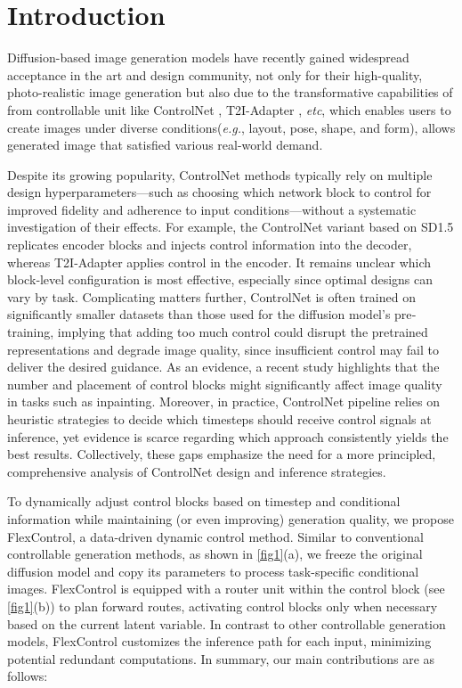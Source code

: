 \section{Introduction}
\label{sec:intro}

Diffusion-based image generation models have recently gained widespread acceptance in the art and design community, not only for their high-quality, photo-realistic image generation but also due to the transformative capabilities of from controllable unit like ControlNet \cite{zhang2023adding}, T2I-Adapter \cite{mou2024t2i}, \textit{etc}, which enables users to create images under diverse conditions(\textit{e.g.}, layout, pose, shape, and form), allows generated image that satisfied various real-world demand.

Despite its growing popularity, ControlNet methods typically rely on multiple design hyperparameters—such as choosing which network block to control for improved fidelity and adherence to input conditions—without a systematic investigation of their effects. For example, the ControlNet variant based on SD1.5 \cite{SD1.5} replicates encoder blocks and injects control information into the decoder, whereas T2I-Adapter applies control in the encoder. It remains unclear which block‐level configuration is most effective, especially since optimal designs can vary by task. Complicating matters further, ControlNet is often trained on significantly smaller datasets than those used for the diffusion model’s pre‐training, implying that adding too much control could disrupt the pretrained representations and degrade image quality, since insufficient control may fail to deliver the desired guidance. As an evidence, a recent study \cite{ju2024brushnet} highlights that the number and placement of control blocks might significantly affect image quality in tasks such as inpainting. Moreover, in practice, ControlNet pipeline relies on heuristic strategies to decide which timesteps should receive control signals at inference, yet evidence is scarce regarding which approach consistently yields the best results. Collectively, these gaps emphasize the need for a more principled, comprehensive analysis of ControlNet design and inference strategies.

To dynamically adjust control blocks based on timestep and conditional information while maintaining (or even improving) generation quality, we propose FlexControl, a data-driven dynamic control method. Similar to conventional controllable generation methods, as shown in \cref{fig1}(a), we freeze the original diffusion model and copy its parameters to process task-specific conditional images. FlexControl is equipped with a router unit within the control block (see \cref{fig1}(b)) to plan forward routes, activating control blocks only when necessary based on the current latent variable.  In contrast to other controllable generation models, FlexControl customizes the inference path for each input, minimizing potential redundant computations. In summary, our main contributions are as follows:

